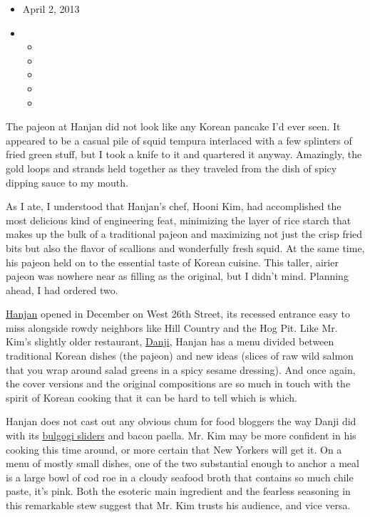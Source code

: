 \begin{itemize}
\item
  April 2, 2013
\item
  \begin{itemize}
  \item
  \item
  \item
  \item
  \item
  \end{itemize}
\end{itemize}

The pajeon at Hanjan did not look like any Korean pancake I'd ever seen.
It appeared to be a casual pile of squid tempura interlaced with a few
splinters of fried green stuff, but I took a knife to it and quartered
it anyway. Amazingly, the gold loops and strands held together as they
traveled from the dish of spicy dipping sauce to my mouth.

As I ate, I understood that Hanjan's chef, Hooni Kim, had accomplished
the most delicious kind of engineering feat, minimizing the layer of
rice starch that makes up the bulk of a traditional pajeon and
maximizing not just the crisp fried bits but also the flavor of
scallions and wonderfully fresh squid. At the same time, his pajeon held
on to the essential taste of Korean cuisine. This taller, airier pajeon
was nowhere near as filling as the original, but I didn't mind. Planning
ahead, I had ordered two.

\href{http://www.hanjan26.com/}{Hanjan} opened in December on West 26th
Street, its recessed entrance easy to miss alongside rowdy neighbors
like Hill Country and the Hog Pit. Like Mr. Kim's slightly older
restaurant,
\href{http://www.nytimes3xbfgragh.onion/2011/08/17/dining/reviews/danji-manhattan-restaurant-review.html?pagewanted=all\&_r=0}{Danji},
Hanjan has a menu divided between traditional Korean dishes (the pajeon)
and new ideas (slices of raw wild salmon that you wrap around salad
greens in a spicy sesame dressing). And once again, the cover versions
and the original compositions are so much in touch with the spirit of
Korean cooking that it can be hard to tell which is which.

Hanjan does not cast out any obvious chum for food bloggers the way
Danji did with its
\href{http://www.nytimes3xbfgragh.onion/2011/09/18/magazine/eat-the-bulgogi-slider-is-a-delicious-curveball.html}{bulgogi
sliders} and bacon paella. Mr. Kim may be more confident in his cooking
this time around, or more certain that New Yorkers will get it. On a
menu of mostly small dishes, one of the two substantial enough to anchor
a meal is a large bowl of cod roe in a cloudy seafood broth that
contains so much chile paste, it's pink. Both the esoteric main
ingredient and the fearless seasoning in this remarkable stew suggest
that Mr. Kim trusts his audience, and vice versa.


